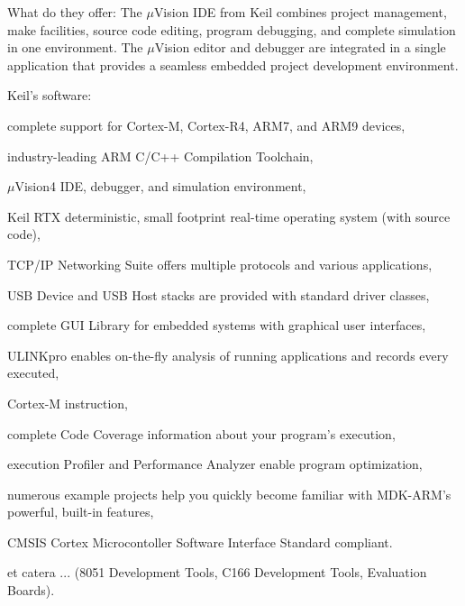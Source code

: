 \documentclass[a4paper,twoside,15pt]{book}
\begin{document}
            What do they offer:
            The $\mu$Vision IDE from Keil combines project management, make facilities, source code editing, program debugging, and complete simulation in one environment. The $\mu$Vision editor and debugger are integrated in a single application that provides a seamless embedded project development environment.
            \begin{dinglist}{73}
                \item Keil's software:
                    \begin{dinglist}{75}
                        \item complete support for Cortex-M, Cortex-R4, ARM7, and ARM9 devices,
                        \item industry-leading ARM C/C++ Compilation Toolchain,
                        \item $\mu$Vision4 IDE, debugger, and simulation environment,
                        \item Keil RTX deterministic, small footprint real-time operating system (with source code),
                        \item TCP/IP Networking Suite offers multiple protocols and various applications,
                        \item USB Device and USB Host stacks are provided with standard driver classes,
                        \item complete GUI Library for embedded systems with graphical user interfaces,
                        \item ULINKpro enables on-the-fly analysis of running applications and records every executed,
                        \item Cortex-M instruction,
                        \item complete Code Coverage information about your program's execution,
                        \item execution Profiler and Performance Analyzer enable program optimization,
                        \item numerous example projects help you quickly become familiar with MDK-ARM's powerful, built-in features,
                        \item CMSIS Cortex Microcontoller Software Interface Standard compliant.
                        \item et catera ... (8051 Development Tools, C166 Development Tools, Evaluation Boards).
                    \end{dinglist}

\end{dinglist}
\end{document}
